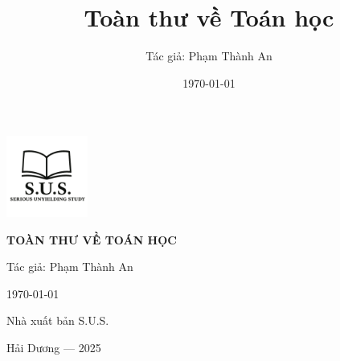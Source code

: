 \documentclass[12pt,a4paper,twoside]{book} %
\title{Toàn thư về Toán học}
\author{Tác giả: Phạm Thành An}
\date{\today}
\begin{document}
\frontmatter

\begin{titlepage}
    \centering
    \vspace*{1cm}
    
    \includegraphics[width=0.2\textwidth]{images/logo.png}
    
    \vfill
    
    \parbox{0.8\textwidth}{
        \centering
        \sffamily %
        {\Huge\bfseries TOÀN THƯ VỀ TOÁN HỌC\par}
        \vspace{2cm}
        {\Large Tác giả: Phạm Thành An\par}
        \vspace{1.5cm}
        {\large \today\par}
    }
    
    \vfill
    \vfill
    
    {\sffamily Nhà xuất bản S.U.S.\par}
    {\sffamily Hải Dương --- 2025\par}
\end{titlepage}

\tableofcontents




\mainmatter


% 

\backmatter
% 
% 
\end{document}
